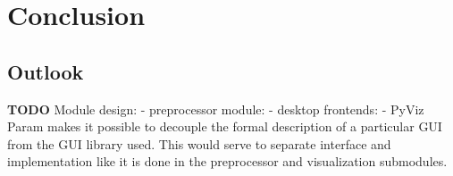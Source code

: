 
\chapter{Conclusion}
\label{chap:conclusion}

\section{Outlook}
\label{sec:outlook}


\textbf{TODO} Module design:
- preprocessor module:
- desktop frontends:
  - PyViz Param \cite{pyviz-param} makes it possible to decouple the formal
  description of a particular GUI from the GUI library used. This would serve to
  separate interface and implementation like it is done in the preprocessor and
  visualization submodules. 


